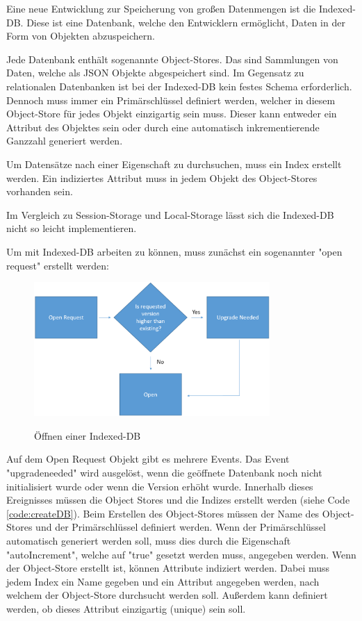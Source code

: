 
Eine neue Entwicklung zur Speicherung von großen Datenmengen ist die Indexed-DB. 
Diese ist eine Datenbank, welche den Entwicklern ermöglicht, Daten in der Form von Objekten abzuspeichern.

Jede Datenbank enthält sogenannte Object-Stores. Das sind Sammlungen von Daten, welche als JSON Objekte abgespeichert sind. 
Im Gegensatz zu relationalen Datenbanken ist bei der Indexed-DB kein festes Schema erforderlich. 
Dennoch muss immer ein Primärschlüssel definiert werden, welcher in diesem Object-Store für jedes Objekt einzigartig sein muss.
Dieser kann entweder ein Attribut des Objektes sein oder durch eine automatisch inkrementierende Ganzzahl generiert werden. 

Um Datensätze nach einer Eigenschaft zu durchsuchen, muss ein Index erstellt werden. Ein indiziertes Attribut muss in jedem Objekt des Object-Stores vorhanden sein.

Im Vergleich zu Session-Storage und Local-Storage lässt sich die Indexed-DB nicht so leicht implementieren.

Um mit Indexed-DB arbeiten zu können, muss zunächst ein sogenannter "open request" erstellt werden:


\begin{figure}[H]
    \centering
    \includegraphics[width=0.8\textwidth]{media/Webspeicher/openDb.png}
    \caption{Öffnen einer Indexed-DB}
    \cite{fig:openDB}
\end{figure}

Auf dem Open Request Objekt gibt es mehrere Events. 
Das Event "upgradeneeded" wird ausgelöst, wenn die geöffnete Datenbank noch nicht initialisiert wurde oder wenn die Version erhöht wurde. 
Innerhalb dieses Ereignisses müssen die Object Stores und die Indizes erstellt werden (siehe Code \ref{code:createDB}). 
Beim Erstellen des Object-Stores müssen der Name des Object-Stores und der Primärschlüssel definiert werden. Wenn der Primärschlüssel automatisch generiert werden soll, muss dies durch die Eigenschaft "autoIncrement", welche auf "true" gesetzt werden muss, angegeben werden.
Wenn der Object-Store erstellt ist, können Attribute indiziert werden. 
Dabei muss jedem Index ein Name gegeben und ein Attribut angegeben werden, nach welchem der Object-Store durchsucht werden soll. 
Außerdem kann definiert werden, ob dieses Attribut einzigartig (unique) sein soll.

